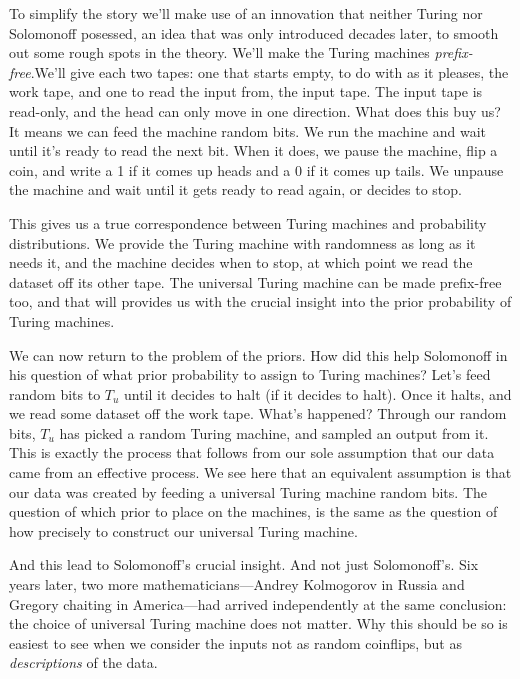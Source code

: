 
To simplify the story we'll make use of an innovation that neither Turing nor Solomonoff posessed, an idea that was only introduced decades later, to smooth out some rough spots in the theory. We'll make the Turing machines \emph{prefix-free}.\footnotemark We'll give each two tapes: one that starts empty, to do with as it pleases, the work tape, and one to read the input from, the input tape. The input tape is read-only, and the head can only move in one direction. What does this buy us? It means we can feed the machine random bits. We run the machine and wait until it's ready to read the next bit. When it does, we pause the machine, flip a coin, and write a 1 if it comes up heads and a 0 if it comes up tails. We unpause the machine and wait until it gets ready to read again, or decides to stop. 


This gives us a true correspondence between Turing machines and probability distributions. We provide the Turing machine with randomness as long as it needs it, and the machine decides when to stop, at which point we read the dataset off its other tape. The universal Turing machine can be made prefix-free too, and that will provides us with the crucial insight into the prior probability of Turing machines. 

We can now return to the problem of the priors. How did this help Solomonoff in his question of what prior probability to assign to Turing machines? Let's feed random bits to $T_u$ until it decides to halt (if it decides to halt). Once it halts, and we read some dataset off the work tape. What's happened? Through our random bits, $T_u$ has picked a random Turing machine, and sampled an output from it. This is exactly the process that follows from our sole assumption that our data came from an effective process. We see here that an equivalent assumption is that our data was created by feeding a universal Turing machine random bits. The question of which prior to place on the machines, is the same as the question of how precisely to construct our universal Turing machine.

And this lead to Solomonoff's crucial insight. And not just Solomonoff's. Six years later, two more mathematicians---Andrey Kolmogorov in Russia and Gregory chaiting in America---had arrived independently at the same conclusion: the choice of universal Turing machine does not matter. Why this should be so is easiest to see when we consider the inputs not as random coinflips, but as \emph{descriptions} of the data. 

